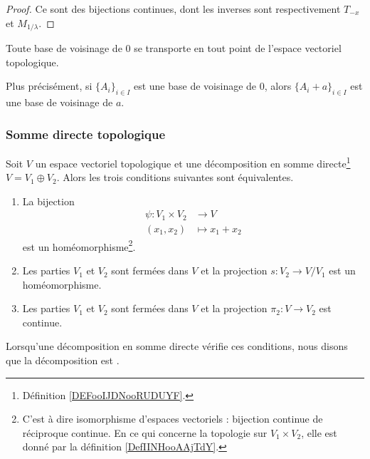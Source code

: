 \begin{proof}
	Ce sont des bijections continues, dont les inverses sont respectivement \( T_{-x} \) et \( M_{1/\lambda} \).
\end{proof}

\begin{corollary}\label{PropInvarianceTopologie}
	Toute base de voisinage de \( 0 \) se transporte en tout point de l'espace vectoriel topologique.

	Plus précisément, si \( \{ A_i \}_{i\in I}\) est une base de voisinage de \( 0\), alors \( \{ A_i+a \}_{i\in I}\) est une base de voisinage de \( a\).
\end{corollary}


\subsubsection{Somme directe topologique}

\begin{propositionDef}     \label{PropKZDqTR}
	Soit \( V\) un espace vectoriel topologique et une décomposition en somme directe\footnote{Définition \ref{DEFooIJDNooRUDUYF}.} \( V=V_1\oplus V_2\). Alors les trois conditions suivantes sont équivalentes.
	\begin{enumerate}
		\item       \label{ITEMooMUELooWdJQeW}
		      La bijection
		      \begin{equation}
			      \begin{aligned}
				      \psi\colon V_1\times V_2 & \to V           \\
				      (x_1,x_2)                & \mapsto x_1+x_2
			      \end{aligned}
		      \end{equation}
		      est un homéomorphisme\footnote{C'est à dire isomorphisme d'espaces vectoriels : bijection continue de réciproque continue. En ce qui concerne la topologie sur \( V_1\times V_2\), elle est donné par la définition \ref{DefIINHooAAjTdY}.}.
		\item       \label{ITEMooDKOYooUpEfOR}
		      Les parties \( V_1\) et \( V_2\) sont fermées dans \( V\) et la projection \( s\colon V_2\to V/V_1\) est un homéomorphisme.
		\item       \label{ITEMooFSSMooCQzTIc}
		      Les parties \( V_1\) et \( V_2\) sont fermées dans \( V\) et la projection \( \pi_2\colon V \to V_2 \) est continue.
	\end{enumerate}
	Lorsqu'une décomposition en somme directe vérifie ces conditions, nous disons que la décomposition est .
\end{propositionDef}

